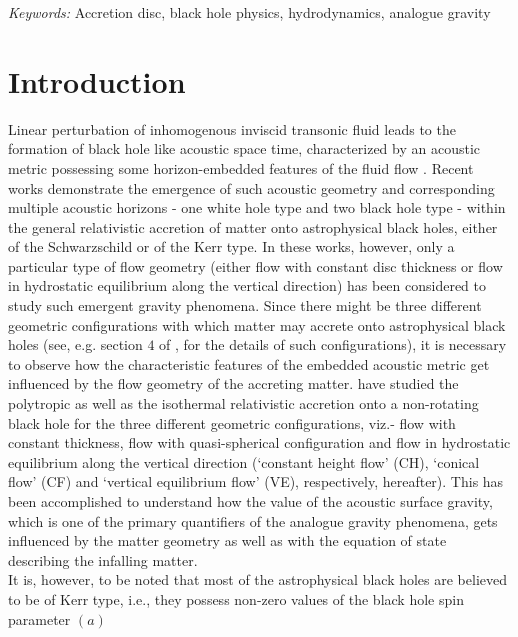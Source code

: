 \documentclass[10pt,authoryear]{article}
\providecommand{\keywords}[1]{\textit{Keywords:} #1}
\begin{document}
\keywords{Accretion disc, black hole physics, hydrodynamics, analogue gravity}

\section{Introduction}
Linear perturbation of inhomogenous inviscid transonic fluid leads to the formation of black hole like 
acoustic space time, characterized by an acoustic metric possessing some horizon-embedded features of the fluid flow 
\cite{unruh81prl,visser98cqg,blv05lrr,us07}.
Recent works 
\cite{abd06cqg,dbd07jcap,pmdc12cqg}
demonstrate the emergence of such acoustic geometry and corresponding multiple acoustic horizons - one white hole 
type and two black hole type - within the general relativistic accretion of matter onto astrophysical black holes, 
either of the Schwarzschild or of the Kerr type. In these works, however, only a particular type of flow 
geometry (either flow with constant disc thickness or flow in hydrostatic equilibrium along the vertical direction) has been considered 
to study such emergent gravity phenomena. Since there might be three different geometric configurations with which 
matter may accrete onto astrophysical black holes 
(see, e.g. section $4$ of \cite{bcdn14cqg}, for the details of such configurations), 
it is necessary to observe how the characteristic features of the embedded acoustic metric get influenced by the 
flow geometry of the accreting matter. 
\cite{td15ijmpd}
have studied the polytropic as well as the isothermal relativistic accretion onto a non-rotating black hole for the 
three different geometric configurations, viz.- flow with constant thickness, flow with quasi-spherical configuration 
and flow in hydrostatic equilibrium along the vertical direction (`constant height flow' (CH), `conical flow' (CF) and 
`vertical equilibrium flow' (VE), respectively, hereafter). This has been accomplished to understand how the value of 
the acoustic surface gravity, which is one of the primary quantifiers of the analogue gravity phenomena, gets influenced 
by the matter geometry as well as with the equation of state describing the infalling matter. \\
It is, however, to be noted that most of the astrophysical black holes are believed to be of Kerr type, i.e., they possess 
non-zero values of the black hole spin parameter $(a)$ 
\end{document}
